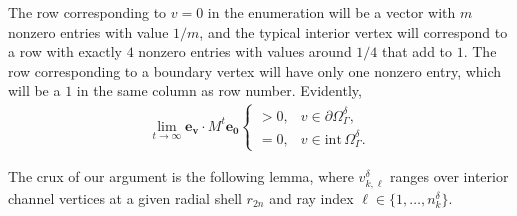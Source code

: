 \documentclass[11pt,reqno]{amsart}
\numberwithin{equation}{section}
\begin{document}
The row corresponding to $v=0$ in the enumeration will be a vector with $m$ nonzero entries with value $1/m$, and the typical interior vertex will correspond to a row with exactly $4$ nonzero entries with values around $1/4$ that add to $1$. The row corresponding to a boundary vertex will have only one nonzero entry, which will be a $1$ in the same column as row number. Evidently,
\begin{align}
 \lim_{t \to \infty} \mathbf{e_v} \cdot M^t \mathbf{e_0}
 \begin{cases}
  > 0, & v \in \partial \varOmega_{\varGamma}^{\delta},\\
  = 0, & v \in \text{int}\,\varOmega_{\varGamma}^{\delta}.
 \end{cases}
\end{align}

The crux of our argument is the following lemma, where $v^{\delta}_{k,\ell}$ ranges over interior channel vertices at a given radial shell $r_{2n}$ and ray index $\ell \in \{1, \dots, n_k^{\delta}\}$.
\end{document}
